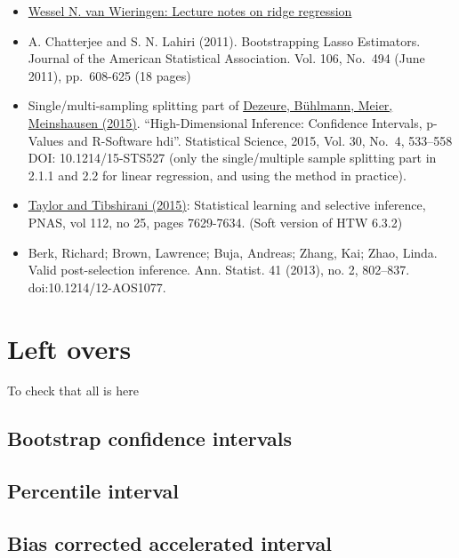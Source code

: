 \documentclass[
  letterpaper,
  DIV=11,
  numbers=noendperiod]{scrartcl}
\providecommand{\tightlist}{%
  \setlength{\itemsep}{0pt}\setlength{\parskip}{0pt}}\usepackage{longtable,booktabs,array}
\begin{document}
\begin{itemize}
\tightlist
\item
  \href{https://arxiv.org/pdf/1509.09169.pdf}{Wessel N. van Wieringen:
  Lecture notes on ridge regression}
\item
  A. Chatterjee and S. N. Lahiri (2011). Bootstrapping Lasso Estimators.
  Journal of the American Statistical Association. Vol. 106, No.~494
  (June 2011), pp.~608-625 (18 pages)
\item
  Single/multi-sampling splitting part of
  \href{https://projecteuclid.org/download/pdfview_1/euclid.ss/1449670857}{Dezeure,
  Bühlmann, Meier, Meinshausen (2015)}. ``High-Dimensional Inference:
  Confidence Intervals, p-Values and R-Software hdi''. Statistical
  Science, 2015, Vol. 30, No.~4, 533--558 DOI: 10.1214/15-STS527 (only
  the single/multiple sample splitting part in 2.1.1 and 2.2 for linear
  regression, and using the method in practice).
\item
  \href{https://www.pnas.org/content/112/25/7629}{Taylor and Tibshirani
  (2015)}: Statistical learning and selective inference, PNAS, vol 112,
  no 25, pages 7629-7634. (Soft version of HTW 6.3.2)
\item
  Berk, Richard; Brown, Lawrence; Buja, Andreas; Zhang, Kai; Zhao,
  Linda. Valid post-selection inference. Ann. Statist. 41 (2013), no. 2,
  802--837. doi:10.1214/12-AOS1077.
\end{itemize}

\hypertarget{left-overs}{%
\section{Left overs}\label{left-overs}}

To check that all is here

\hypertarget{bootstrap-confidence-intervals}{%
\subsection{Bootstrap confidence
intervals}\label{bootstrap-confidence-intervals}}

\hypertarget{percentile-interval}{%
\subsection{Percentile interval}\label{percentile-interval}}

\hypertarget{bias-corrected-accelerated-interval}{%
\subsection{Bias corrected accelerated
interval}\label{bias-corrected-accelerated-interval}}
\end{document}
